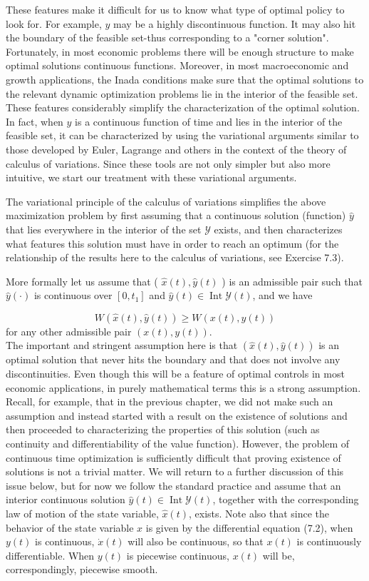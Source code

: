 \documentclass[\topdir/lecture_notes.tex]{subfiles}
\begin{document}
These features make it difficult for us to know what type of optimal policy to look for. For example, $y$ may be a highly discontinuous function. It may also hit the boundary of the feasible set-thus corresponding to a "corner solution". Fortunately, in most economic problems there will be enough structure to make optimal solutions continuous functions. Moreover, in most macroeconomic and growth applications, the Inada conditions make sure that the optimal solutions to the relevant dynamic optimization problems lie in the interior of the feasible set. These features considerably simplify the characterization of the optimal solution. In fact, when $y$ is a continuous function of time and lies in the interior of the feasible set, it can be characterized by using the variational arguments similar to those developed by Euler, Lagrange and others in the context of the theory of calculus of variations. Since these tools are not only simpler but also more intuitive, we start our treatment with these variational arguments.

The variational principle of the calculus of variations simplifies the above maximization problem by first assuming that a continuous solution (function) $\hat{y}$ that lies everywhere in the interior of the set $\mathcal{Y}$ exists, and then characterizes what features this solution must have in order to reach an optimum (for the relationship of the results here to the calculus of variations, see Exercise 7.3).

More formally let us assume that ( $\hat{x}(t), \hat{y}(t)$ ) is an admissible pair such that $\hat{y}(\cdot)$ is continuous over $\left[0, t_{1}\right]$ and $\hat{y}(t) \in \operatorname{Int} \mathcal{Y}(t)$, and we have

\[
W(\hat{x}(t), \hat{y}(t)) \geq W(x(t), y(t))
\]
for any other admissible pair $(x(t), y(t))$.\\
The important and stringent assumption here is that $(\hat{x}(t), \hat{y}(t))$ is an optimal solution that never hits the boundary and that does not involve any discontinuities. Even though this will be a feature of optimal controls in most economic applications, in purely mathematical terms this is a strong assumption. Recall, for example, that in the previous chapter, we did not make such an assumption and instead started with a result on the existence of solutions and then proceeded to characterizing the properties of this solution (such as continuity and differentiability of the value function). However, the problem of continuous time optimization is sufficiently difficult that proving existence of solutions is not a trivial matter. We will return to a further discussion of this issue below, but for now we follow the standard practice and assume that an interior continuous solution $\hat{y}(t) \in \operatorname{Int} \mathcal{Y}(t)$, together with the corresponding law of motion of the state variable, $\hat{x}(t)$, exists. Note also that since the behavior of the state variable $x$ is given by the differential equation (7.2), when $y(t)$ is continuous, $\dot{x}(t)$ will also be continuous, so that $x(t)$ is continuously differentiable. When $y(t)$ is piecewise continuous, $x(t)$ will be, correspondingly, piecewise smooth.
\end{document}
